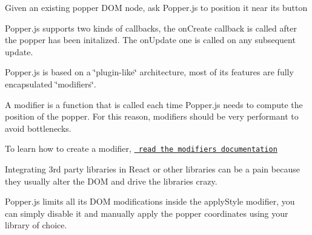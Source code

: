 Given an existing popper D\+OM node, ask Popper.\+js to position it near its button


\begin{DoxyCode}{0}
\DoxyCodeLine{    \{}
\DoxyCodeLine{    \}}
\DoxyCodeLine{);}
\end{DoxyCode}


Popper.\+js supports two kinds of callbacks, the {\ttfamily on\+Create} callback is called after the popper has been initalized. The {\ttfamily on\+Update} one is called on any subsequent update.


\begin{DoxyCode}{0}
\DoxyCodeLine{    \},}
\DoxyCodeLine{    \}}
\DoxyCodeLine{\});}
\end{DoxyCode}


Popper.\+js is based on a \char`\"{}plugin-\/like\char`\"{} architecture, most of its features are fully encapsulated \char`\"{}modifiers\char`\"{}.

A modifier is a function that is called each time Popper.\+js needs to compute the position of the popper. For this reason, modifiers should be very performant to avoid bottlenecks.

To learn how to create a modifier, \href{docs/_includes/popper-documentation.md\#modifiers--object}{\texttt{ read the modifiers documentation}}

Integrating 3rd party libraries in React or other libraries can be a pain because they usually alter the D\+OM and drive the libraries crazy.

Popper.\+js limits all its D\+OM modifications inside the {\ttfamily apply\+Style} modifier, you can simply disable it and manually apply the popper coordinates using your library of choice.


